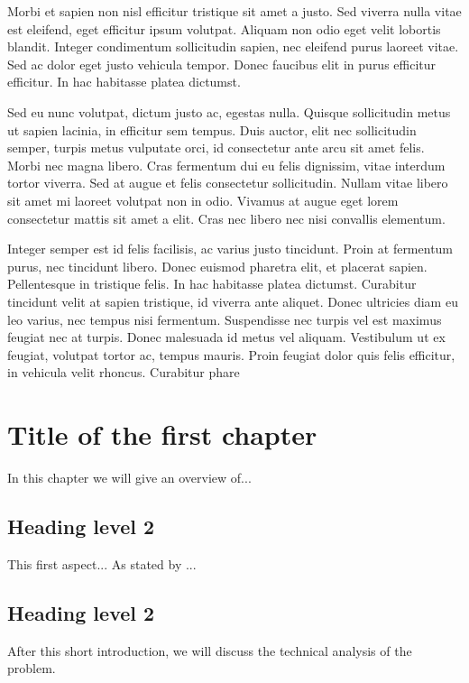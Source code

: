 \documentclass[12pt,a4paper,oneside]{report}
\begin{document}
Morbi et sapien non nisl efficitur tristique sit amet a justo. Sed viverra nulla vitae est eleifend, eget efficitur ipsum volutpat. Aliquam non odio eget velit lobortis blandit. Integer condimentum sollicitudin sapien, nec eleifend purus laoreet vitae. Sed ac dolor eget justo vehicula tempor. Donec faucibus elit in purus efficitur efficitur. In hac habitasse platea dictumst.

Sed eu nunc volutpat, dictum justo ac, egestas nulla. Quisque sollicitudin metus ut sapien lacinia, in efficitur sem tempus. Duis auctor, elit nec sollicitudin semper, turpis metus vulputate orci, id consectetur ante arcu sit amet felis. Morbi nec magna libero. Cras fermentum dui eu felis dignissim, vitae interdum tortor viverra. Sed at augue et felis consectetur sollicitudin. Nullam vitae libero sit amet mi laoreet volutpat non in odio. Vivamus at augue eget lorem consectetur mattis sit amet a elit. Cras nec libero nec nisi convallis elementum.

Integer semper est id felis facilisis, ac varius justo tincidunt. Proin at fermentum purus, nec tincidunt libero. Donec euismod pharetra elit, et placerat sapien. Pellentesque in tristique felis. In hac habitasse platea dictumst. Curabitur tincidunt velit at sapien tristique, id viverra ante aliquet. Donec ultricies diam eu leo varius, nec tempus nisi fermentum. Suspendisse nec turpis vel est maximus feugiat nec at turpis. Donec malesuada id metus vel aliquam. Vestibulum ut ex feugiat, volutpat tortor ac, tempus mauris. Proin feugiat dolor quis felis efficitur, in vehicula velit rhoncus. Curabitur phare

\newpage

\chapter{Title of the first chapter}

In this chapter we will give an overview of...

\section{Heading level 2}

This first aspect... As stated by \cite{Distribution}...

\section{Heading level 2}

After this short introduction, we will discuss the technical analysis of the problem.\\
\end{document}
